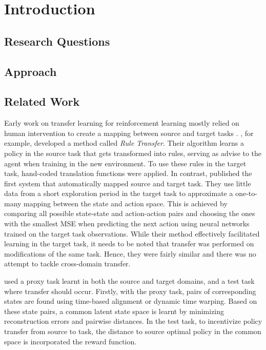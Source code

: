 \section{Introduction}
\label{sec:introduction}

\subsection{Research Questions}

\subsection{Approach}

\subsection{Related Work}
\label{sec:related-work}

Early work on transfer learning for reinforcement learning mostly relied on human intervention to create a mapping between source and target tasks \citep[e.g.][]{taylor2007cross}. \citet{taylor2007cross}, for example, developed a method called \textit{Rule Transfer}. Their algorithm learns a policy in the source task that gets transformed into rules, serving as advise to the agent when training in the new environment. To use these rules in the target task, hand-coded translation functions were applied. In contrast, \citet{taylor2008autonomous} published the first system that automatically mapped source and target task. They use little data from a short exploration period in the target task to approximate a one-to-many mapping between the state and action space. This is achieved by comparing all possible state-state and action-action pairs and choosing the ones with the smallest MSE when predicting the next action using neural networks trained on the target task observations. While their method effectively facilitated learning in the target task, it needs to be noted that transfer was performed on modifications of the same task. Hence, they were fairly similar and there was no attempt to tackle cross-domain transfer. 


\citet{gupta2017learning} used a proxy task learnt in both the source and target domains, and a test task where transfer should occur. Firstly, with the proxy task, pairs of corresponding states are found using time-based alignment or dynamic time warping. Based on these state pairs, a common latent state space is learnt by minimizing reconstruction errors and pairwise distances. In the test task, to incentivize policy transfer from source to task, the distance to source optimal policy in the common space is incorporated the reward function.

